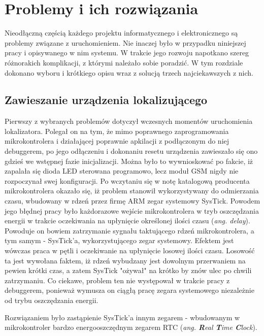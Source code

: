 \chapter{Problemy i ich rozwiązania}
\label{problems_and_solutions}

Nieodłączną częścią każdego projektu informatycznego i elektronicznego są problemy związane z uruchomieniem. Nie inaczej było w przypadku niniejszej pracy i opisywanego w nim systemu. W trakcie jego rozwoju napotkano szereg różnorakich komplikacji, z którymi należało sobie poradzić. W tym rozdziale dokonano wyboru i krótkiego opisu wraz z solucją trzech najciekawszych z nich.


\section{Zawieszanie urządzenia lokalizującego}

Pierwszy z wybranych problemów dotyczył wczesnych momentów uruchomienia lokalizatora. Polegał on na tym, że mimo poprawnego zaprogramowania mikrokontrolera i działającej poprawnie apkilacji z podłączonym do niej debuggerem, po jego odłączeniu i dokonaniu resetu urządzenia zawieszało się ono gdzieś we wstępnej fazie inicjalizacji. Można było to wywnioskować po fakcie, iż zapalała się dioda LED sterowana programowo, lecz moduł GSM nigdy nie rozpoczynał swej konfiguracji. Po wczytaniu się w notę katalogową producenta mikrokontrolera okazało się, iż problem stanowił wykorzystywany do odmierzania czasu, wbudowany w rdzeń przez firmę ARM zegar systemowy SysTick. Powodem jego błędnej pracy było każdorazowe wejście mikrokontrolera w tryb oszczędzania energii w trakcie oczekiwania na upłynięcie określonej ilości czasu (\textit{ang. delay}). Powoduje on bowiem zatrzymanie sygnału taktującego rdzeń mikrokontrolera, a tym samym - SysTick'a, wykorzystującego zegar systemowy. Efektem jest wówczas praca w pętli i oczekiwanie na upłynięcie losowej ilości czasu. Losowość ta jest wywołana faktem, iż rdzeń wybudzany jest dowolnym przerwaniem na pewien krótki czas, a zatem SysTick "ożywał" na krótko by znów ulec po chwili zatrzymaniu. Co ciekawe, problem ten nie występował w trakcie pracy z debuggerem, ponieważ wymusza on ciągłą pracę zegara systemowego niezależnie od trybu oszczędzania energii. 

Rozwiązaniem było zastąpienie SysTick'a innym zegarem - wbudowanym w mikrokontroler bardzo energooszczędnym zegarem RTC (\textit{ang. \textbf{R}eal \textbf{T}ime \textbf{C}lock}).


